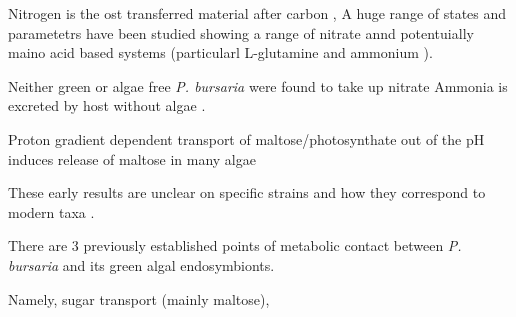 Nitrogen is the ost transferred material after carbon \citep{Kato2009}, 
A huge range of states and parametetrs have been studied showing a range
of nitrate annd potentuially maino acid based systems (particularl L-glutamine and ammonium \citep{Albers1982}).


Neither green or algae free \textit{P. bursaria} were found to take up nitrate 
Ammonia is excreted by host without algae \citep{Albers1982}.


Proton gradient dependent transport of maltose/photosynthate out of the \citep{Schussler1992}
pH induces release of maltose in many algae \citep{}




These early results are unclear on specific strains and how they correspond
to modern taxa \citep{Kato2009}. 



%

%
%
%
%
%



There are 3 previously established points of metabolic contact between 
\textit{P. bursaria} and its green algal endosymbionts. 

Namely, sugar transport (mainly maltose), 

